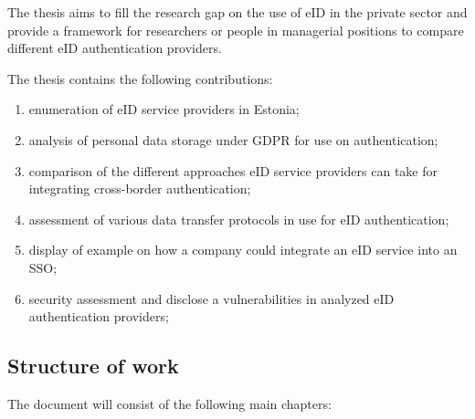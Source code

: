 The thesis aims to fill the research gap on the use of eID in the private sector and provide a framework for researchers or people in managerial positions to compare different eID authentication providers.

The thesis contains the following contributions:

\begin{enumerate}
    \item enumeration of eID service providers in Estonia;
    \item analysis of personal data storage under GDPR for use on authentication;
    \item comparison of the different approaches eID service providers can take for integrating cross-border authentication;
    \item assessment of various data transfer protocols in use for eID authentication;
    \item display of example on how a company could integrate an eID service into an SSO;
    \item security assessment and disclose a vulnerabilities in analyzed eID authentication providers;
\end{enumerate}




\subsection{Structure of work}

The document will consist of the following main chapters:

